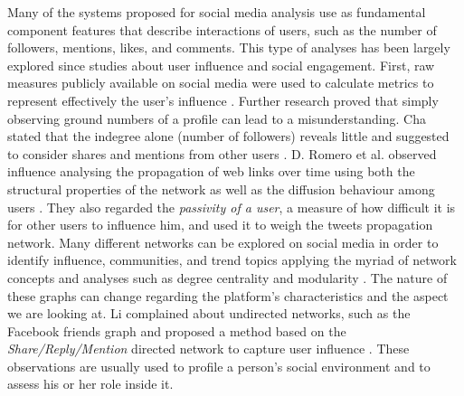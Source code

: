 Many of the systems proposed for social media analysis use as fundamental component features that describe interactions of users, such as the number of followers, mentions, likes, and comments.
This type of analyses has been largely explored since studies about user influence and social engagement. First, raw measures publicly available on social media were used to calculate metrics to represent effectively the user's influence \cite{oviedo2014metric}.
Further research proved that simply observing ground numbers of a profile can lead to a misunderstanding. Cha stated that the indegree alone (number of followers) reveals little and suggested to consider shares and mentions from other users \cite{cha2010measuring}.
D. Romero et al. observed influence analysing the propagation of web links over time using both the structural properties of the network as well as the diffusion behaviour among users \cite{romero2011influence}. They also regarded the \emph{passivity of a user}, a measure of how difficult it is for other users to influence him, and used it to weigh the tweets propagation network. 
Many different networks can be explored on social media in order to identify influence, communities, and trend topics applying the myriad of network concepts and analyses such as degree centrality and modularity \cite{chae2015insights}. 
The nature of these graphs can change regarding the platform's characteristics and the aspect we are looking at. Li complained about undirected networks, such as the Facebook friends graph and proposed a method based on the \emph{Share/Reply/Mention} directed network to capture user influence \cite{li2014social}.
These observations are usually used to profile a person's social environment and to assess his or her role inside it. 

